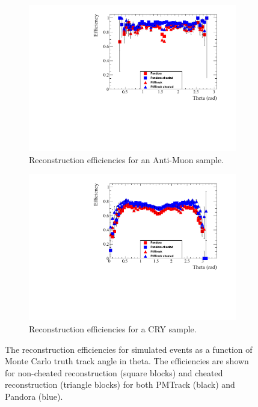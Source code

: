 \begin{figure}[h!]
  \centering
  \begin{subfigure}{0.45\textwidth}
    \centering
    \includegraphics[width=\textwidth]{Effic_AntiMuon_500V_All_Theta}
    \caption{Reconstruction efficiencies for an Anti-Muon sample.}
    \label{fig:SimEffic_Theta_AMu}
  \end{subfigure}
  \hspace{0.08\textwidth}
  \begin{subfigure}{0.45\textwidth}
    \centering
    \includegraphics[width=\textwidth]{Effic_Cosmics_500V_All_Theta}
    \caption{Reconstruction efficiencies for a CRY sample.}
    \label{fig:SimEffic_Theta_CRY}
  \end{subfigure}
  \caption[The reconstruction efficiencies for simulated events as a function of Monte Carlo truth track angle in theta.]
          {The reconstruction efficiencies for simulated events as a function of Monte Carlo truth track angle in theta. The efficiencies are shown for non-cheated reconstruction (square blocks) and cheated reconstruction (triangle blocks) for both PMTrack (black) and Pandora (blue).}
          \label{fig:SimEffic_Theta}
\end{figure}

